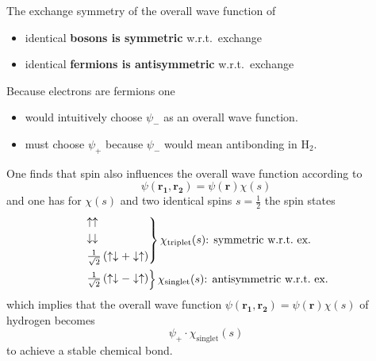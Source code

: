 
The exchange symmetry of the overall wave function of
\begin{itemize}
    \item identical \textbf{bosons is symmetric} w.r.t.\ exchange
    \item identical \textbf{fermions is antisymmetric} w.r.t.\ exchange
\end{itemize}


Because electrons are fermions one
\begin{itemize}
    \item would intuitively choose $\psi_{-}$ as an overall wave function.
    \item must choose $\psi_{+}$ because $\psi_{-}$ would mean antibonding in $\mathrm{H}_2$.
\end{itemize}
One finds that spin also influences the overall wave function according to
\begin{equation*}
    \psi(\mathbf{r_1},\mathbf{r_2})=\psi(\mathbf{r})\chi(s)
\end{equation*}
and one has for $\chi(s)$ and two identical spins $s=\frac{1}{2}$ the spin states
\begin{align*}
     & \begin{rcases}
           \uparrow \uparrow                                                        \\
           \downarrow \downarrow                                                    \\
           \frac{1}{\sqrt{2}}\left(\uparrow \downarrow + \downarrow \uparrow\right) \\
       \end{rcases} \chi_{\mathrm{triplet}}(s)\text{: symmetric w.r.t.\ ex.} \\
     & \begin{rcases}
           \frac{1}{\sqrt{2}}\left(\uparrow \downarrow - \downarrow \uparrow\right)
       \end{rcases} \chi_{\mathrm{singlet}}(s) \text{: antisymmetric w.r.t.\ ex.}
\end{align*}
which implies that the overall wave function $\psi(\mathbf{r_1},\mathbf{r_2})=\psi(\mathbf{r})\chi(s)$ of hydrogen becomes
\begin{equation*}
    \psi_{+}\cdot \chi_{\mathrm{singlet}}(s)
\end{equation*}
to achieve a stable chemical bond.

